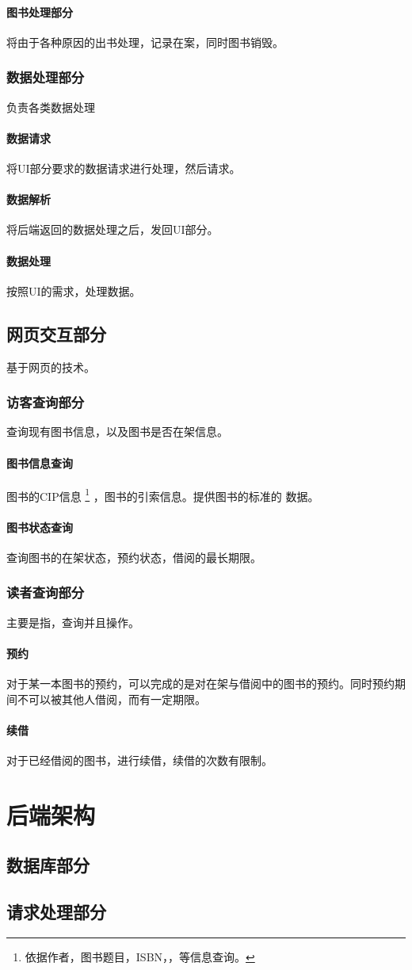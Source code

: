 \documentclass[UTF8]{ctexrep}
\begin{document}
    \subsection{图书处理部分}
    将由于各种原因的出书处理，记录在案，同时图书销毁。
    \section{数据处理部分}
    负责各类数据处理
    \subsection{数据请求}
    将UI部分要求的数据请求进行处理，然后请求。
    \subsection{数据解析}
    将后端返回的数据处理之后，发回UI部分。
    \subsection{数据处理}
    按照UI的需求，处理数据。
    \chapter{网页交互部分}
    基于网页的技术。
    \section{访客查询部分}
    查询现有图书信息，以及图书是否在架信息。
    \subsection{图书信息查询}
    图书的CIP信息
    \footnote{依据作者，图书题目，ISBN，，等信息查询。}
    ，图书的引索信息。提供图书的标准的 \BibTeX 数据。
    \subsection{图书状态查询}
    查询图书的在架状态，预约状态，借阅的最长期限。
    \section{读者查询部分}
    主要是指，查询并且操作。
    \subsection{预约}
    对于某一本图书的预约，可以完成的是对在架与借阅中的图书的预约。同时预约期间不可以被其他人借阅，而有一定期限。
    \subsection{续借}
    对于已经借阅的图书，进行续借，续借的次数有限制。
    \part{后端架构}
    \setcounter{chapter}{0}
    \chapter{数据库部分}
    \chapter{请求处理部分}
    
\end{document}
